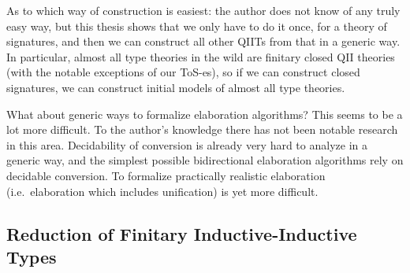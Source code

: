 \documentclass[12pt,a4paper,twoside,openany]{book}
\theoremstyle{remark}
\theoremstyle{definition}
\theoremstyle{theorem}
\begin{document}
As to which way of construction is easiest: the author does not know of any
truly easy way, but this thesis shows that we only have to do it once, for a
theory of signatures, and then we can construct all other QIITs from that in a
generic way. In particular, almost all type theories in the wild are finitary closed QII
theories (with the notable exceptions of our ToS-es), so if we can construct
closed signatures, we can construct initial models of almost all type theories.

What about generic ways to formalize elaboration algorithms? This seems to be a
lot more difficult. To the author's knowledge there has not been notable
research in this area. Decidability of conversion is already very hard to
analyze in a generic way, and the simplest possible bidirectional elaboration
algorithms rely on decidable conversion. To formalize practically realistic
elaboration (i.e.\ elaboration which includes unification) is yet more
difficult.

\subsection{Reduction of Finitary Inductive-Inductive Types}
\end{document}
